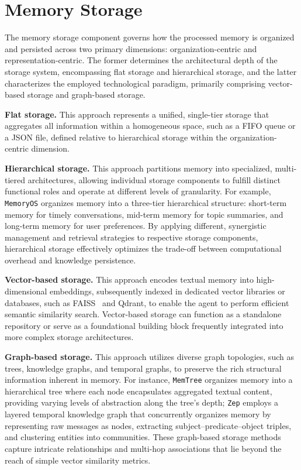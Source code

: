 \section{Memory Storage}
\label{sec:mem_storage}

The memory storage component governs how the processed memory is organized and persisted across two primary dimensions: organization-centric and representation-centric.
The former determines the architectural depth of the storage system, encompassing flat storage and hierarchical storage, and the latter characterizes the employed technological paradigm, primarily comprising vector-based storage and graph-based storage.

 \textbf{Flat storage.}
This approach represents a unified, single-tier storage that aggregates all information within a homogeneous space, such as a FIFO queue or a JSON file, defined relative to hierarchical storage within the organization-centric dimension.

 \textbf{Hierarchical storage.}
This approach partitions memory into specialized, multi-tiered architectures, allowing individual storage components to fulfill distinct functional roles and operate at different levels of granularity. For example, {\tt MemoryOS} organizes memory into a three-tier hierarchical structure: short-term memory for timely conversations, mid-term memory for topic summaries, and long-term memory for user preferences. %
By applying different, synergistic management and retrieval strategies to respective storage components, hierarchical storage effectively optimizes the trade-off between computational overhead and knowledge persistence.

 \textbf{Vector-based storage.}
This approach encodes textual memory into high-dimensional embeddings, subsequently indexed in dedicated vector libraries or databases, such as FAISS~\cite{douze2025faisslibrary} and Qdrant, to enable the agent to perform efficient semantic similarity search. Vector-based storage can function as a standalone repository or serve as a foundational building block frequently integrated into more complex storage architectures.

 \textbf{Graph-based storage.}
This approach utilizes diverse graph topologies, such as trees, knowledge graphs, and temporal graphs, to preserve the rich structural information inherent in memory. For instance, {\tt MemTree} organizes memory into a hierarchical tree where each node encapsulates aggregated textual content, providing varying levels of abstraction along the tree's depth; {\tt Zep} employs a layered temporal knowledge graph that concurrently organizes memory by representing raw messages as nodes, extracting subject–predicate–object triples, and clustering entities into communities. These graph-based storage methods capture intricate relationships and multi-hop associations that lie beyond the reach of simple vector similarity metrics.
